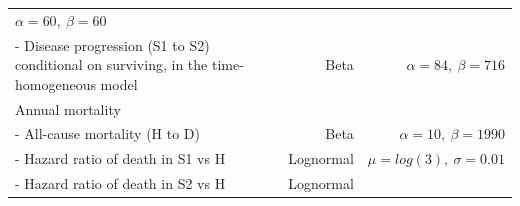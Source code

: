 \documentclass[
]{article}
\begin{document}
\begin{longtable}[]{@{}lrr@{}}
\begin{minipage}[t]{0.42\columnwidth}
\(\alpha=60, \ \beta=60\)\strut
\end{minipage}\tabularnewline
\begin{minipage}[t]{0.32\columnwidth}\raggedright
- Disease progression (S1 to S2) conditional on surviving, in the
time-homogeneous model\strut
\end{minipage} & \begin{minipage}[t]{0.17\columnwidth}\raggedleft
Beta\strut
\end{minipage} & \begin{minipage}[t]{0.42\columnwidth}\raggedleft
\(\alpha=84, \ \beta=716\)\strut
\end{minipage}\tabularnewline
\begin{minipage}[t]{0.32\columnwidth}\raggedright
Annual mortality\strut
\end{minipage} & \begin{minipage}[t]{0.17\columnwidth}\raggedleft
\strut
\end{minipage} & \begin{minipage}[t]{0.42\columnwidth}\raggedleft
\strut
\end{minipage}\tabularnewline
\begin{minipage}[t]{0.32\columnwidth}\raggedright
- All-cause mortality (H to D)\strut
\end{minipage} & \begin{minipage}[t]{0.17\columnwidth}\raggedleft
Beta\strut
\end{minipage} & \begin{minipage}[t]{0.42\columnwidth}\raggedleft
\(\alpha=10, \ \beta=1990\)\strut
\end{minipage}\tabularnewline
\begin{minipage}[t]{0.32\columnwidth}\raggedright
- Hazard ratio of death in S1 vs H\strut
\end{minipage} & \begin{minipage}[t]{0.17\columnwidth}\raggedleft
Lognormal\strut
\end{minipage} & \begin{minipage}[t]{0.42\columnwidth}\raggedleft
\(\mu = log(3), \ \sigma = 0.01\)\strut
\end{minipage}\tabularnewline
\begin{minipage}[t]{0.32\columnwidth}\raggedright
- Hazard ratio of death in S2 vs H\strut
\end{minipage} & \begin{minipage}[t]{0.17\columnwidth}\raggedleft
Lognormal\strut
\end{minipage} & \begin{minipage}[t]{0.42\columnwidth}\raggedleft

\end{minipage}
\end{longtable}
\end{document}
